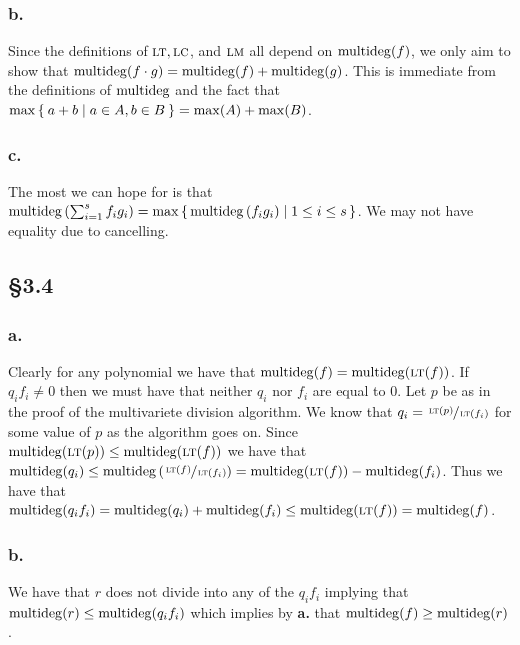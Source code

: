 \documentclass[letterpaper]{article}
\begin{document}
\subsubsection{b.}

Since the definitions of $\operatorname{\textsc{lt}}, \operatorname{\textsc{lc}}$, and $\operatorname{\textsc{lm}}$ all depend on $\operatorname{multideg}(f)$, we only aim to show that $\operatorname{multideg}(f \cdot g) = \operatorname{multideg}(f) + \operatorname{multideg}(g)$. This is immediate from the definitions of $\operatorname{multideg}$ and the fact that $\max\Set{a + b | a \in A, b \in B} = \max(A) + \max(B)$. 

\subsubsection{c.}

The most we can hope for is that $\mdeg\pqty{\sum_{i = 1}^{s} f_{i} g_{i}} = \max\set{\mdeg\pqty{f_{i} g_{i}} | 1 \leq i \leq s}$. We may not have equality due to cancelling.

\clearpage

\subsection{\S 3.4}

\subsubsection{a.}

Clearly for any polynomial we have that $\operatorname{multideg}(f) = \operatorname{multideg}(\operatorname{\textsc{lt}}(f))$. If $q_{i} f_{i} \neq 0$ then we must have that neither $q_{i}$ nor $f_{i}$ are equal to $0$. Let $p$ be as in the proof of the multivariete division algorithm. We know that $q_{i} = \sfrac{\operatorname{\textsc{lt}}(p)}{\operatorname{\textsc{lt}}(f_{i})}$ for some value of $p$ as the algorithm goes on. Since $\operatorname{multideg}(\operatorname{\textsc{lt}}(p)) \leq \operatorname{multideg}(\operatorname{\textsc{lt}}(f))$ we have that $\mdeg(q_{i}) \leq \mdeg\pqty{\sfrac{\lt(f)}{\lt(f_{i})}} = \mdeg(\lt(f)) - \mdeg(f_{i})$. Thus we have that $\operatorname{multideg}(q_{i}f_{i}) = \operatorname{multideg}(q_{i}) + \operatorname{multideg}(f_{i}) \leq \operatorname{multideg}(\operatorname{\textsc{lt}}(f)) = \operatorname{multideg}(f)$.

\subsubsection{b.}

We have that $r$ does not divide into any of the $q_{i}f_{i}$ implying that $\operatorname{multideg}(r) \leq \operatorname{multideg}(q_{i} f_{i})$ which implies by \textbf{a.} that $\operatorname{multideg}(f) \geq \operatorname{multideg}(r)$.
\end{document}
